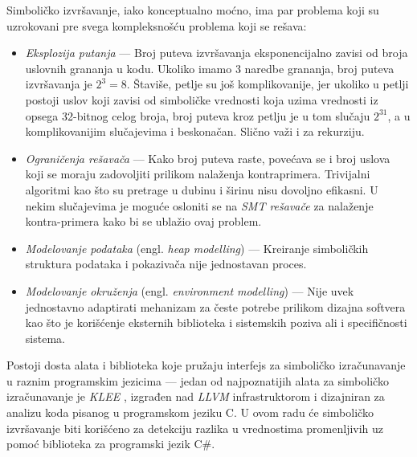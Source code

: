 Simboličko izvršavanje, iako konceptualno moćno, ima par problema koji su uzrokovani pre svega kompleksnošću problema koji se rešava:
\begin{itemize}
    \item \emph{Eksplozija putanja} --- Broj puteva izvršavanja eksponencijalno zavisi od broja uslovnih grananja u kodu. Ukoliko imamo 3 naredbe grananja, broj puteva izvršavanja je $2^3=8$. Štaviše, petlje su još komplikovanije, jer ukoliko u petlji postoji uslov koji zavisi od simboličke vrednosti koja uzima vrednosti iz opsega 32-bitnog celog broja, broj puteva kroz petlju je u tom slučaju $2^{31}$, a u komplikovanijim slučajevima i beskonačan. Slično važi i za rekurziju.
    \item \emph{Ograničenja rešavača} --- Kako broj puteva raste, povećava se i broj uslova koji se moraju zadovoljiti prilikom nalaženja kontraprimera. Trivijalni algoritmi kao što su pretrage u dubinu i širinu nisu dovoljno efikasni. U nekim slučajevima je moguće osloniti se na \emph{SMT rešavače} \cite{SMT} za nalaženje kontra-primera kako bi se ublažio ovaj problem.
    \item \emph{Modelovanje podataka} (engl. \emph{heap modelling}) --- Kreiranje simboličkih struktura podataka i pokazivača nije jednostavan proces.
    \item \emph{Modelovanje okruženja} (engl. \emph{environment modelling}) --- Nije uvek jednostavno adaptirati mehanizam za česte potrebe prilikom dizajna softvera kao što je korišćenje eksternih biblioteka i sistemskih poziva ali i specifičnosti sistema.
\end{itemize}

Postoji dosta alata i biblioteka koje pružaju interfejs za simboličko izračunavanje u raznim programskim jezicima --- jedan od najpoznatijih alata za simboličko izračunavanje je \emph{KLEE} \cite{KLEE}, izgrađen nad \emph{LLVM} infrastruktorom \cite{LLVM} i dizajniran za analizu koda pisanog u programskom jeziku C. U ovom radu će simboličko izvršavanje biti korišćeno za detekciju razlika u vrednostima promenljivih uz pomoć biblioteka za programski jezik C\#.
